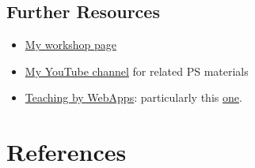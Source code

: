 \documentclass[
]{book}
\providecommand{\tightlist}{%
  \setlength{\itemsep}{0pt}\setlength{\parskip}{0pt}}
\begin{document}
\hypertarget{further-resources}{%
\section{Further Resources}\label{further-resources}}

\begin{itemize}
\tightlist
\item
  \href{https://ehsank.com/workshops/}{My workshop page}
\item
  \href{https://www.youtube.com/watch?v=-9W6h0MVrKI\&list=PL2yD6frXhFob_Mvfg21Y01t_yu1aC9NnP\&index=22}{My YouTube channel} for related PS materials
\item
  \href{https://ehsank.com/webapps/}{Teaching by WebApps}: particularly this \href{https://ehsanx.shinyapps.io/project1/}{one}.
\end{itemize}

\hypertarget{ref}{%
\chapter*{References}\label{ref}}

  
\end{document}
